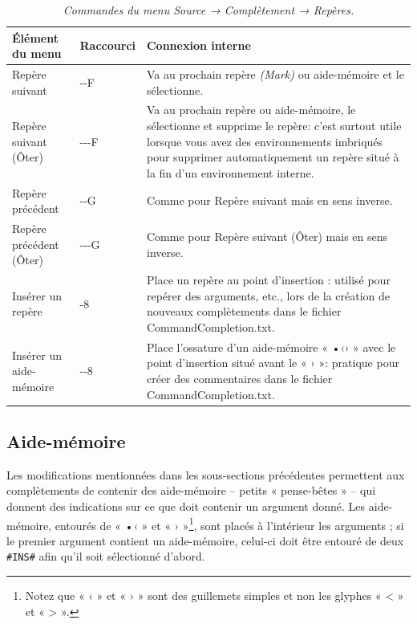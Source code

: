 \documentclass[12pt,french]{article}
\newcommand{\alt}{{\WD \symbol{85}}}
\newcommand{\ctr}{{\WD \symbol{84}}}
\newcommand{\cmd}{{\WA \symbol{122}}}
\begin{document}
\setlength{\belowcaptionskip}{\baselineskip}
\renewcommand{\arraystretch}{1}
\begin{table}[htbp]
 \caption{\emph{Commandes du menu \textsf{Source} → \textsf{Complètement} → \textsf{Repères}.}
\label{commandes}}
 \centering
  \begin{tabular}{@{} p{3.8cm} p{1.75cm} p{8.3cm} @{}}
    \toprule
   \textbf{Élément du menu} & \textbf{Raccourci} & \textbf{Connexion interne} \\ 
    \midrule
    \textsf{Repère suivant} & \ctr-\cmd-F & Va au prochain repère \emph{(Mark)} ou aide-mémoire et le sélectionne.\\ 
    \textsf{Repère suivant (Ôter)} & \ctr-\alt-\cmd-F & Va au prochain repère ou aide-mémoire, le sélectionne et 
supprime le repère: c'est surtout utile lorsque vous avez des environnements imbriqués pour supprimer 
automatiquement un repère situé à la fin d'un environnement interne. \\ 
    \textsf{Repère précédent} & \ctr-\cmd-G & Comme pour \textsf{Repère suivant} mais en sens inverse. \\ 
    \textsf{Repère précédent (Ôter)} & \ctr-\alt-\cmd-G & Comme pour \textsf{Repère suivant (Ôter)} mais en sens 
inverse. \\ 
    \textsf{Insérer un repère} & \cmd-8 & Place un repère au point d'insertion : utilisé pour repérer des arguments, 
etc., lors de la création de nouveaux complètements dans le fichier \textsf{CommandCompletion.txt}. \\ 
    \textsf{Insérer un aide-mémoire} & \ctr-\cmd-8 & Place l'ossature d'un aide-mémoire « •‹› » avec le point d'insertion 
situé avant le « › »: pratique pour créer des commentaires dans le fichier \textsf{CommandCompletion.txt}. \\ 
    \bottomrule
  \end{tabular}
\end{table}

\subsection*{Aide-mémoire}

Les modifications mentionnées dans les sous-sections précédentes permettent aux complètements de contenir des 
aide-mémoire -- petits « pense-bêtes » -- qui donnent des indications sur ce que doit contenir un argument donné. 
Les aide-mémoire, entourés de « •‹ » et « › »\footnote{Notez que « ‹ » et « › » sont des guillemets simples et non les 
glyphes « < » et « > ».}, sont placés à l'intérieur les arguments ; si le premier argument contient un aide-mémoire, 
celui-ci doit être entouré de deux \texttt{\#INS\#} afin qu'il soit sélectionné d'abord.
\end{document}
